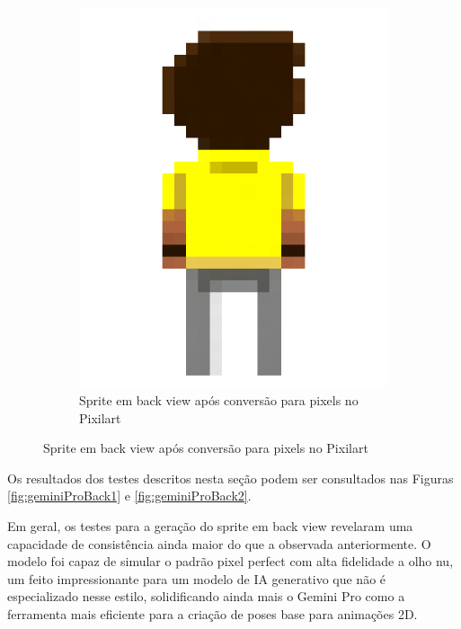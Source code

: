 \begin{figure}[htbp]
\begin{subfigure}{0.45\linewidth}
        \includegraphics[width=1\linewidth]{figs/geminiPro/back_pixel_grande.png}
        \caption{\small Sprite em back view após conversão para pixels no Pixilart}
        \label{fig:geminiProBackEdicaoMelhorAposConversao}
    \end{subfigure}\hfill
\end{figure}

Os resultados dos testes descritos nesta seção podem ser consultados nas Figuras \ref{fig:geminiProBack1} e \ref{fig:geminiProBack2}.

Em geral, os testes para a geração do sprite em back view revelaram uma capacidade de consistência ainda maior do que a observada anteriormente. O modelo foi capaz de simular o padrão pixel perfect com alta fidelidade a olho nu, um feito impressionante para um modelo de IA generativo que não é especializado nesse estilo, solidificando ainda mais o Gemini Pro como a ferramenta mais eficiente para a criação de poses base para animações 2D.

